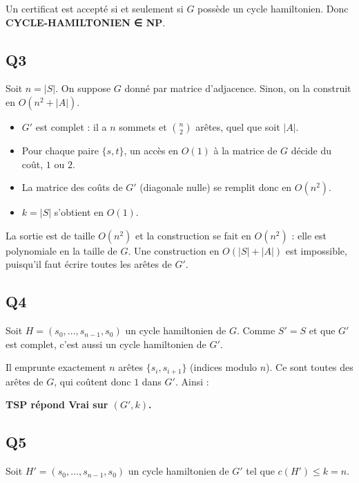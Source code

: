 \documentclass[11pt,a4paper]{article}
\providecommand{\tightlist}{\setlength{\itemsep}{0pt}\setlength{\parskip}{0pt}}
\newcommand{\equationajustee}[1]{%
  \sbox{\boiteequation}{$\displaystyle #1$}%
  \ifdim\wd\boiteequation>\linewidth
    \[\resizebox{\linewidth}{!}{\usebox{\boiteequation}}\]%
  \else
    \[#1\]%
  \fi}
\begin{document}
Un certificat est accepté si et seulement si \(G\) possède un cycle hamiltonien. Donc \textbf{CYCLE-HAMILTONIEN ∈ NP}.

\hypertarget{q3}{%
\subsection{Q3}\label{q3}}

Soit \(n=|S|\). On suppose \(G\) donné par matrice d'adjacence. Sinon, on la construit en \(O(n^2+|A|)\).

\begin{itemize}
\tightlist
\item
  \(G'\) est complet : il a \(n\) sommets et \(\binom n2\) arêtes, quel que soit \(|A|\).
\item
  Pour chaque paire \(\{s,t\}\), un accès en \(O(1)\) à la matrice de \(G\) décide du coût, \(1\) ou \(2\).
\item
  La matrice des coûts de \(G'\) (diagonale nulle) se remplit donc en \(O(n^2)\).
\item
  \(k=|S|\) s'obtient en \(O(1)\).
\end{itemize}

La sortie est de taille \(O(n^2)\) et la construction se fait en \textbf{\(O(n^2)\)} : elle est polynomiale en la taille de \(G\). Une construction en \(O(|S|+|A|)\) est impossible, puisqu'il faut écrire toutes les arêtes de \(G'\).

\hypertarget{q4}{%
\subsection{Q4}\label{q4}}

Soit \(H=(s_0,\dots,s_{n-1},s_0)\) un cycle hamiltonien de \(G\). Comme \(S'=S\) et que \(G'\) est complet, c'est aussi un cycle hamiltonien de \(G'\).

Il emprunte exactement \(n\) arêtes \(\{s_i,s_{i+1}\}\) (indices modulo \(n\)). Ce sont toutes des arêtes de \(G\), qui coûtent donc \(1\) dans \(G'\). Ainsi :

\equationajustee{c(H)=n=k.}

\textbf{TSP répond Vrai sur \((G',k)\).}

\hypertarget{q5}{%
\subsection{Q5}\label{q5}}

Soit \(H'=(s_0,\dots,s_{n-1},s_0)\) un cycle hamiltonien de \(G'\) tel que \(c(H')\le k=n\).
\end{document}
